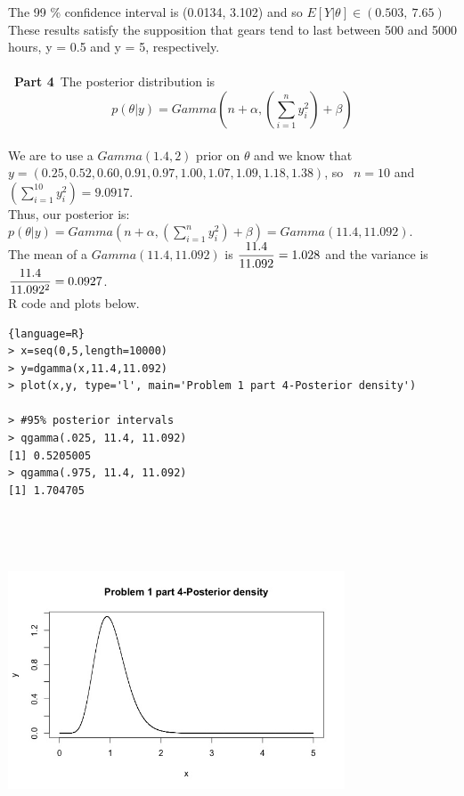\documentclass[10pt,a4paper]{article}
\begin{document}
The 99 \% confidence interval is (0.0134, 3.102) and so $E[Y|\theta ] \in (0.503,\ 7.65)$\\
These results satisfy the supposition that gears tend to last between 500 and 5000 hours, y = 0.5 and y = 5, respectively. 
\\\
\\\
\textbf{Part 4}\
The posterior distribution is $$p(\theta|y)=Gamma(n+\alpha, (\sum_{i=1}^{n}y_i^2)+\beta)$$ \\
We are to use a $Gamma(1.4,2)$ prior on $\theta$ and  we know that\\
 $y=(0.25, 0.52, 0.60, 0.91, 0.97, 1.00, 1.07, 1.09, 1.18, 1.38)$,
so \ $n=10$ and $(\sum_{i=1}^{10}y_i^2)=9.0917$.\\
Thus, our posterior is:
$p(\theta|y)=Gamma(n+\alpha, (\sum_{i=1}^{n}y_i^2)+\beta)=Gamma(11.4,11.092)$.\\
The mean of a $Gamma(11.4,11.092)$ is $\mathlarger{\frac{11.4}{11.092} = 1.028}$ and the variance is $\mathlarger{\frac{11.4}{11.092^2}=0.0927}$. \\
R code and plots below.\\
\begin{lstlisting}{language=R}
> x=seq(0,5,length=10000)
> y=dgamma(x,11.4,11.092)
> plot(x,y, type='l', main='Problem 1 part 4-Posterior density')

> #95% posterior intervals
> qgamma(.025, 11.4, 11.092)
[1] 0.5205005
> qgamma(.975, 11.4, 11.092)
[1] 1.704705
\end{lstlisting}
\includegraphics[width=10cm,height=10cm,keepaspectratio]{prob1part4}\\
\end{document}
